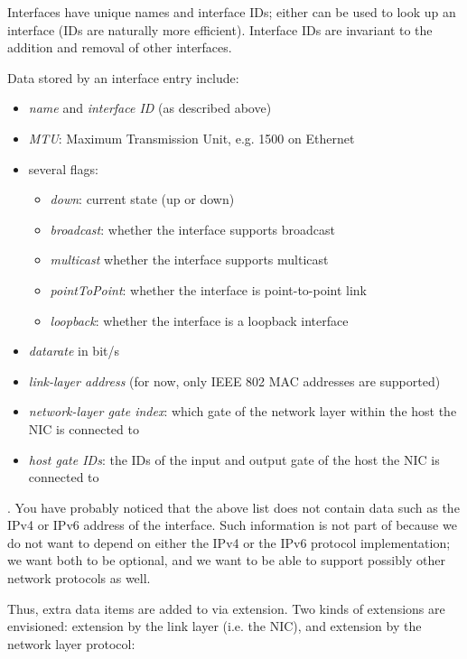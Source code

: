Interfaces have unique names and interface IDs; either can be used to look up
an interface (IDs are naturally more efficient). Interface IDs are invariant to
the addition and removal of other interfaces.

Data stored by an interface entry include:

\begin{itemize}
  \item \textit{name} and \textit{interface ID} (as described above)
  \item \textit{MTU}: Maximum Transmission Unit, e.g. 1500 on Ethernet
  \item several flags:
    \begin{itemize}
      \item \textit{down}: current state (up or down)
      \item \textit{broadcast}: whether the interface supports broadcast
      \item \textit{multicast} whether the interface supports multicast
      \item \textit{pointToPoint}: whether the interface is point-to-point link
      \item \textit{loopback}: whether the interface is a loopback interface
    \end{itemize}
  \item \textit{datarate} in bit/s
  \item \textit{link-layer address} (for now, only IEEE 802 MAC addresses are supported)
  \item \textit{network-layer gate index}: which gate of the network layer within the host the NIC is connected to
  \item \textit{host gate IDs}: the IDs of the input and output gate of the host the NIC is connected to
\end{itemize}

. You have probably noticed that the above list does not
contain data such as the IPv4 or IPv6 address of the interface. Such
information is not part of  because we do not want
 to depend on either the IPv4 or the IPv6 protocol
implementation; we want both to be optional, and we want
 to be able to support possibly other network
protocols as well.

Thus, extra data items are added to  via
extension. Two kinds of extensions are envisioned: extension by the link
layer (i.e. the NIC), and extension by the network layer protocol:

